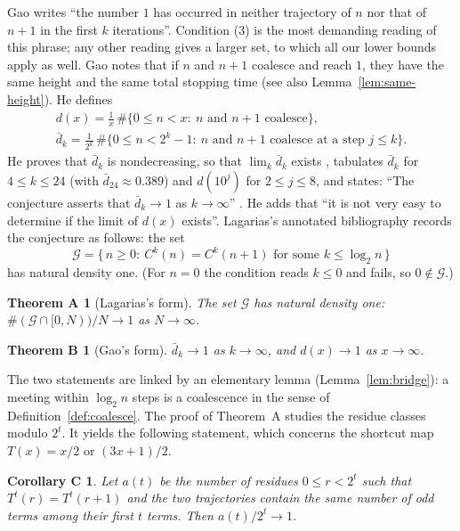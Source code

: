 \documentclass[11pt]{amsart}
\newtheorem*{theoremA}{Theorem A}
\newtheorem*{theoremB}{Theorem B}
\newtheorem*{corollaryC}{Corollary C}
\theoremstyle{definition}
\theoremstyle{remark}
\newcommand{\dbar}{\bar d}
\begin{document}
Gao writes ``the number $1$ has occurred in neither trajectory of $n$ nor that of $n+1$ in the first $k$ iterations''. Condition (3) is the most demanding reading of this phrase; any other reading gives a larger set, to which all our lower bounds apply as well. Gao notes that if $n$ and $n+1$ coalesce and reach $1$, they have the same height and the same total stopping time (see also Lemma~\ref{lem:same-height}). He defines
\begin{gather*}
d(x)=\frac1x\,\#\{0\le n<x:\ n \text{ and } n+1 \text{ coalesce}\},\\
\dbar_k=\frac1{2^k}\,\#\{0\le n<2^k-1:\ n \text{ and } n+1 \text{ coalesce at a step } j\le k\}.
\end{gather*}
He proves that $\dbar_k$ is nondecreasing, so that $\lim_k \dbar_k$ exists \cite[Corollary~2]{Gao93}, tabulates $\dbar_k$ for $4\le k\le 24$ (with $\dbar_{24}\approx 0.389$) and $d(10^j)$ for $2\le j\le 8$, and states: ``The conjecture asserts that $\dbar_k\to1$ as $k\to\infty$'' \cite[p.~265]{Gao93}. He adds that ``it is not very easy to determine if the limit of $d(x)$ exists''. Lagarias's annotated bibliography \cite[entry~68]{Lag03} records the conjecture as follows: the set
\[
\mathcal G=\{\,n\ge0:\ C^{k}(n)=C^{k}(n+1) \text{ for some } k\le \log_2 n\,\}
\]
has natural density one. (For $n=0$ the condition reads $k\le 0$ and fails, so $0\notin\mathcal G$.)

\begin{theoremA}[Lagarias's form]
The set $\mathcal G$ has natural density one: $\#(\mathcal G\cap[0,N))/N\to1$ as $N\to\infty$.
\end{theoremA}

\begin{theoremB}[Gao's form]
$\dbar_k\to 1$ as $k\to\infty$, and $d(x)\to 1$ as $x\to\infty$.
\end{theoremB}

The two statements are linked by an elementary lemma (Lemma~\ref{lem:bridge}): a meeting within $\log_2 n$ steps is a coalescence in the sense of Definition~\ref{def:coalesce}. The proof of Theorem~A studies the residue classes modulo $2^t$. It yields the following statement, which concerns the shortcut map $T(x)=x/2$ or $(3x+1)/2$.

\begin{corollaryC}
Let $a(t)$ be the number of residues $0\le r<2^t$ such that $T^{t}(r)=T^{t}(r+1)$ and the two trajectories contain the same number of odd terms among their first $t$ terms. Then $a(t)/2^t\to1$.
\end{corollaryC}
\end{document}
